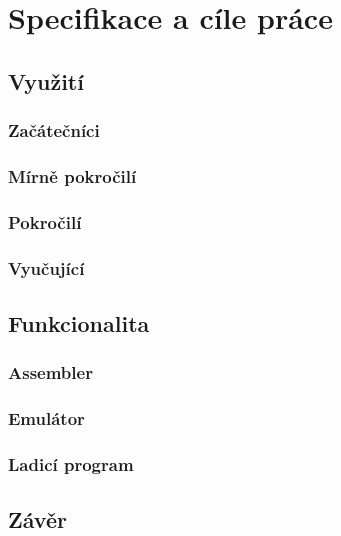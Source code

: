 \chapter{Specifikace a cíle práce}

\blind[2]

\section{Využití}

\blind[1]

\subsection{Začátečníci}

\blind[3]

\subsection{Mírně pokročilí}

\blind[2]

\subsection{Pokročilí}

\blind[1]

\subsection{Vyučující}

\blind[2]

\section{Funkcionalita}

\subsection{Assembler}

\blind[2]

\subsection{Emulátor}

\blind[3]

\subsection{Ladicí program}

\blind[2]

\section{Závěr}

\blind[1]